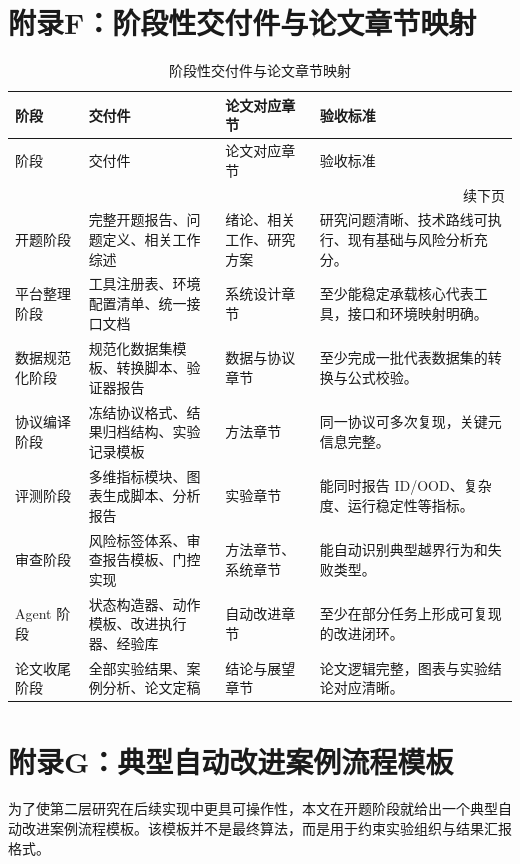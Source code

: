 \documentclass[UTF8,12pt]{ctexart}
\begin{document}
\section{附录F：阶段性交付件与论文章节映射}

\small
\begin{longtable}{p{2.3cm}p{4.3cm}p{3.0cm}p{4.5cm}}
\caption{阶段性交付件与论文章节映射}\label{tab:deliverable-map}\\
\toprule
阶段 & 交付件 & 论文对应章节 & 验收标准 \\
\midrule
\endfirsthead
\toprule
阶段 & 交付件 & 论文对应章节 & 验收标准 \\
\midrule
\endhead
\midrule
\multicolumn{4}{r}{续下页}\\
\endfoot
\bottomrule
\endlastfoot
开题阶段 & 完整开题报告、问题定义、相关工作综述 & 绪论、相关工作、研究方案 & 研究问题清晰、技术路线可执行、现有基础与风险分析充分。 \\
平台整理阶段 & 工具注册表、环境配置清单、统一接口文档 & 系统设计章节 & 至少能稳定承载核心代表工具，接口和环境映射明确。 \\
数据规范化阶段 & 规范化数据集模板、转换脚本、验证器报告 & 数据与协议章节 & 至少完成一批代表数据集的转换与公式校验。 \\
协议编译阶段 & 冻结协议格式、结果归档结构、实验记录模板 & 方法章节 & 同一协议可多次复现，关键元信息完整。 \\
评测阶段 & 多维指标模块、图表生成脚本、分析报告 & 实验章节 & 能同时报告 ID/OOD、复杂度、运行稳定性等指标。 \\
审查阶段 & 风险标签体系、审查报告模板、门控实现 & 方法章节、系统章节 & 能自动识别典型越界行为和失败类型。 \\
Agent 阶段 & 状态构造器、动作模板、改进执行器、经验库 & 自动改进章节 & 至少在部分任务上形成可复现的改进闭环。 \\
论文收尾阶段 & 全部实验结果、案例分析、论文定稿 & 结论与展望章节 & 论文逻辑完整，图表与实验结论对应清晰。 \\
\end{longtable}
\normalsize

\section{附录G：典型自动改进案例流程模板}

为了使第二层研究在后续实现中更具可操作性，本文在开题阶段就给出一个典型自动改进案例流程模板。该模板并不是最终算法，而是用于约束实验组织与结果汇报格式。
\end{document}
